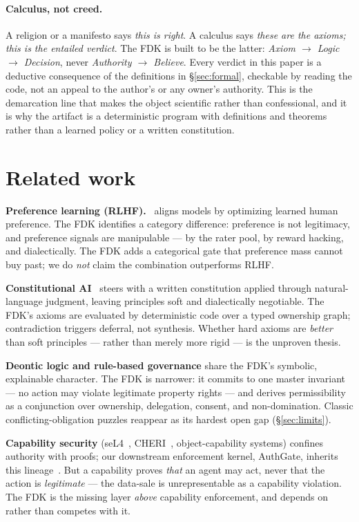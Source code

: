 \documentclass[11pt]{article}
\begin{document}
\paragraph{Calculus, not creed.} A religion or a manifesto says \emph{this is right}. A
calculus says \emph{these are the axioms; this is the entailed verdict}. The FDK is built to
be the latter: \emph{Axiom $\to$ Logic $\to$ Decision}, never \emph{Authority $\to$
Believe}. Every verdict in this paper is a deductive consequence of the definitions in
\S\ref{sec:formal}, checkable by reading the code, not an appeal to the author's or any
owner's authority. This is the demarcation line that makes the object scientific rather than
confessional, and it is why the artifact is a deterministic program with definitions and
theorems rather than a learned policy or a written constitution.

\section{Related work}
\label{sec:related}

\textbf{Preference learning (RLHF).}~\citep{christiano2017,ouyang2022} aligns models by
optimizing learned human preference. The FDK identifies a category difference: preference is
not legitimacy, and preference signals are manipulable --- by the rater pool, by reward
hacking, and dialectically. The FDK adds a categorical gate that preference mass cannot buy
past; we do \emph{not} claim the combination outperforms RLHF.

\textbf{Constitutional AI}~\citep{bai2022} steers with a written constitution applied through
natural-language judgment, leaving principles soft and dialectically negotiable. The FDK's
axioms are evaluated by deterministic code over a typed ownership graph; contradiction
triggers deferral, not synthesis. Whether hard axioms are \emph{better} than soft principles
--- rather than merely more rigid --- is the unproven thesis.

\textbf{Deontic logic and rule-based governance} share the FDK's symbolic, explainable
character. The FDK is narrower: it commits to one master invariant --- no action may violate
legitimate property rights --- and derives permissibility as a conjunction over ownership,
delegation, consent, and non-domination. Classic conflicting-obligation puzzles reappear as
its hardest open gap (\S\ref{sec:limits}).

\textbf{Capability security} (seL4~\citep{klein2009}, CHERI~\citep{watson2015},
object-capability systems) confines authority with proofs; our downstream enforcement kernel,
AuthGate, inherits this lineage~\citep{authgate2026}. But a capability proves \emph{that} an
agent may act, never that the action is \emph{legitimate} --- the data-sale is unrepresentable
as a capability violation. The FDK is the missing layer \emph{above} capability enforcement,
and depends on rather than competes with it.
\end{document}
